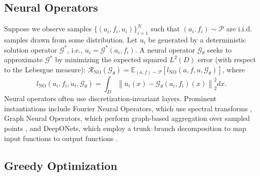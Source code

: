 \documentclass{article} %
\begin{document}




\subsection{Neural Operators} \label{sec:neuraloperators}

Suppose we observe samples $\{(a_i, f_i, u_i)\}_{i = 1}^N$ such that $(a_i, f_i) \sim \mathcal{P}$ are i.i.d. samples drawn from some distribution. Let $u_i$ be generated by a deterministic solution operator $\mathcal{G}^{*}$, i.e., $u_i = \mathcal{G}^{*}(a_i, f_i)$. 
A neural operator  $\mathcal{G}_{\theta}$ seeks to approximate $\mathcal{G}^*$ by minimizing the expected squared $L^2(D)$ error (with respect to the Lebesgue measure): $\mathcal{R}_{\text{NO}}(\mathcal{G}_{\theta})  = \mathbb{E}_{(a, f) \sim  \mathcal{P}}\left[l_{\text{NO}}(a, f, u, \mathcal{G}_{\theta})\right]$, where
\begin{equation*} \label{eq:NOloss}
    l_{\text{NO}}(a_i, f_i, u_i, \mathcal{G}_{\theta}) = \int_{D} \left\|u_i(x) - \mathcal{G}_{\theta}(a_i, f_i)(x)\right\|_2^2dx.
\end{equation*}
Neural operators often use discretization-invariant layers. Prominent instantiations include Fourier Neural Operators, which use spectral transforms \citep{li2020fourier}, Graph Neural Operators, which perform graph-based aggregation over sampled points \citep{li2020multipole}, and DeepONets, which employ a trunk–branch decomposition to map input functions to output functions \citep{lu2021learning}. 


\subsection{Greedy Optimization} \label{sec:bggreedy}
\end{document}

